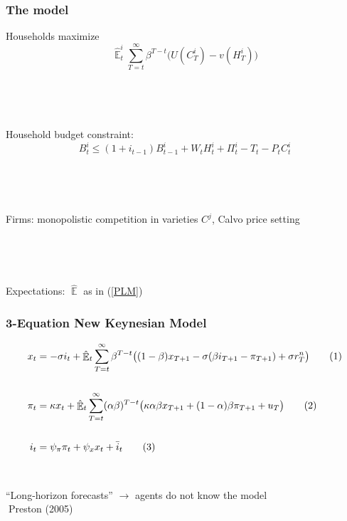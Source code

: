 \documentclass{beamer}
\DeclareMathOperator{\E}{\mathbb{E}}
\newcommand\numberthis{\addtocounter{equation}{1}\tag{\theequation}} %
\begin{document}
\begin{frame}
	\frametitle{The model}

Households maximize
\begin{equation}
\hat{\E}^i_t \sum_{T=t}^{\infty} \beta^{T-t} \bigg( U(C^i_{T}) - v(H^i_{T})\bigg)
\end{equation}

\

\

Household budget constraint:
\begin{equation}
 B^i_t \leq (1+i_{t-1})B^i_{t-1} + W_tH^i_t + \Pi_t^i -T_t -P_tC^i_t
\end{equation}


\

\

Firms: monopolistic competition in varieties $C^j$, Calvo price setting

\

\

Expectations: $\hat{\E}$ as in (\ref{PLM})

\end{frame}

\begin{frame}
	\frametitle{3-Equation New Keynesian Model}
	\label{NK}

\begin{align*}
x_t &=  -\sigma i_t +\hat{\E}_t \sum_{T=t}^{\infty} \beta^{T-t }\big( (1-\beta)x_{T+1} - \sigma(\beta i_{T+1} - \pi_{T+1}) +\sigma r_T^n \big) \label{prestons18}  \numberthis \\
\\
\pi_t &= \kappa x_t +\hat{\E}_t \sum_{T=t}^{\infty} (\alpha\beta)^{T-t }\big( \kappa \alpha \beta x_{T+1} + (1-\alpha)\beta \pi_{T+1} + u_T\big) \label{prestons19}  \numberthis \\
\\
i_t &= \psi_{\pi}\pi_t + \psi_{x} x_t + \bar{i}_t \label{TR} \numberthis
\end{align*}

\

``Long-horizon forecasts'' $\rightarrow$ agents do not know the model\\
$\; $Preston (2005)

\

\hyperlink{derivations}{} \\
\hyperlink{compact}{}	


\end{frame}
\end{document}
